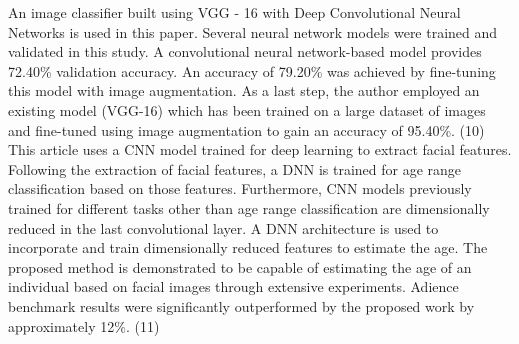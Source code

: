 \documentclass[conference]{IEEEtran}
\begin{document}
An image classifier built using VGG - 16 with Deep Convolutional Neural Networks is used in this paper. Several neural network models were trained and validated in this study. A convolutional neural network-based model provides 72.40\% validation accuracy. An accuracy of 79.20\% was achieved by fine-tuning this model with image augmentation. As a last step, the author employed an existing model (VGG-16) which has been trained on a large dataset of images and fine-tuned using image augmentation to gain an accuracy of 95.40\%. (10) This article uses a CNN model trained for deep learning to extract facial features. Following the extraction of facial features, a DNN is trained for age range classification based on those features. Furthermore, CNN models previously trained for different tasks other than age range classification are dimensionally reduced in the last convolutional layer. A DNN architecture is used to incorporate and train dimensionally reduced features to estimate the age. The proposed method is demonstrated to be capable of estimating the age of an individual based on facial images through extensive experiments. Adience benchmark results were significantly outperformed by the proposed work by approximately 12\%. (11)  
\end{document}
